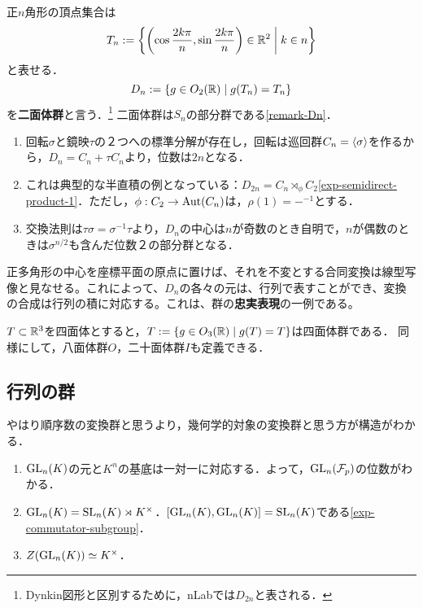 \documentclass[uplatex,dvipdfmx]{jsreport}
\begin{document}
\begin{example}
    正$n$角形の頂点集合は
    \[T_n:=\left\{\left(\cos\frac{2k\pi}{n},\sin\frac{2k\pi}{n}\right)\in\mathbb{R}^2\;\middle|\;k\in n\right\}\]
    と表せる．
    \[D_n:=\{g\in O_2(\mathbb{R})\mid g(T_n)=T_n\}\]
    を\textbf{二面体群}と言う．\footnote{Dynkin図形と区別するために，nLabでは$D_{2n}$と表される．}
    二面体群は$S_n$の部分群である\ref{remark-Dn}．
    \begin{enumerate}
        \item 回転$\sigma$と鏡映$\tau$の２つへの標準分解が存在し，回転は巡回群$C_n=\langle\sigma\rangle$を作るから，$D_n=C_n+\tau C_n$より，位数は$2n$となる．
        \item これは典型的な半直積の例となっている：$D_{2n}=C_n\rtimes_\phi C_2$\ref{exp-semidirect-product-1}．ただし，$\phi:C_2\to\mathrm{Aut}(C_n)$は，$\rho(1)={-}^{-1}$とする．
        \item 交換法則は$\tau\sigma=\sigma^{-1}\tau$より，$D_n$の中心は$n$が奇数のとき自明で，$n$が偶数のときは$\sigma^{n/2}$も含んだ位数２の部分群となる．
    \end{enumerate}
    正多角形の中心を座標平面の原点に置けば、それを不変とする合同変換は線型写像と見なせる。これによって、$D_n$の各々の元は、行列で表すことができ、変換の合成は行列の積に対応する。これは、群の\textbf{忠実表現}の一例である。
\end{example}

\begin{example}
    $T\subset\mathbb{R}^3$を四面体とすると，$T:=\{g\in O_3(\mathbb{R})\mid g(T)=T\}$は四面体群である．
    同様にして，八面体群$O$，二十面体群$I$も定義できる．
\end{example}

\subsection{行列の群}

\begin{tcolorbox}[colframe=ForestGreen, colback=ForestGreen!10!white,breakable,colbacktitle=ForestGreen!40!white,coltitle=black,fonttitle=\bfseries\sffamily,
title=]
    やはり順序数の変換群と思うより，幾何学的対象の変換群と思う方が構造がわかる．
\end{tcolorbox}

\begin{example}\mbox{}
    \begin{enumerate}
        \item $\mathrm{GL}_n(K)$の元と$K^n$の基底は一対一に対応する．よって，$\mathrm{GL}_n(\mathcal{F}_p)$の位数がわかる．
        \item $\mathrm{GL}_n(K)=\mathrm{SL}_n(K)\rtimes K^\times$．$[\mathrm{GL}_n(K),\mathrm{GL}_n(K)]=\mathrm{SL}_n(K)$である\ref{exp-commutator-subgroup}．
        \item $Z(\mathrm{GL}_n(K))\simeq K^\times$．
    \end{enumerate}
\end{example}
\end{document}
